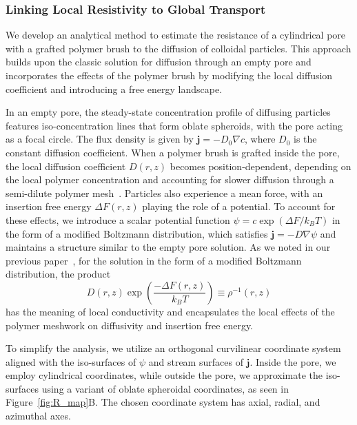 \documentclass[12pt, a4paper]{article}
\begin{document}
\subsubsection{Linking Local Resistivity to Global Transport}

We develop an analytical method to estimate the resistance of a cylindrical pore with a grafted polymer brush to the diffusion of colloidal particles. 
This approach builds upon the classic solution for diffusion through an empty pore and incorporates the effects of the polymer brush by modifying the local diffusion coefficient and introducing a free energy landscape.

In an empty pore, the steady-state concentration profile of diffusing particles features iso-concentration lines that form oblate spheroids, with the pore acting as a focal circle.
The flux density is given by $\mathbf{j} = -D_0 \nabla c$, where $D_0$ is the constant diffusion coefficient.
When a polymer brush is grafted inside the pore, the local diffusion coefficient $D(r,z)$ becomes position-dependent, depending on the local polymer concentration and accounting for slower diffusion through a semi-dilute polymer mesh~\cite{Cai2011}.
Particles also experience a mean force, with an insertion free energy $\Delta F(r,z)$ playing the role of a potential. To account for these effects, we introduce a scalar potential function $\psi = c\exp(\Delta F / k_B T)$ in the form of a modified Boltzmann distribution, which satisfies $\mathbf{j} = -D \nabla \psi$ and maintains a structure similar to the empty pore solution.
As we noted in our previous paper~\cite{Laktionov2023}, for the solution in the form of a modified Boltzmann distribution, the product
\begin{equation}
    D(r,z) \exp\left( \frac{-\Delta F(r,z)}{k_B T} \right) \equiv \rho^{-1}(r,z)
    \label{eq:local_conuctivity}
\end{equation}
has the meaning of local conductivity and encapsulates the local effects of the polymer meshwork on diffusivity and insertion free energy.

To simplify the analysis, we utilize an orthogonal curvilinear coordinate system aligned with the iso-surfaces of $\psi$ and stream surfaces of $\bm{j}$.
Inside the pore, we employ cylindrical coordinates, while outside the pore, we approximate the iso-surfaces using a variant of oblate spheroidal coordinates, as seen in Figure~\ref{fig:R_map}B. The chosen coordinate system has axial, radial, and azimuthal axes.
\end{document}
